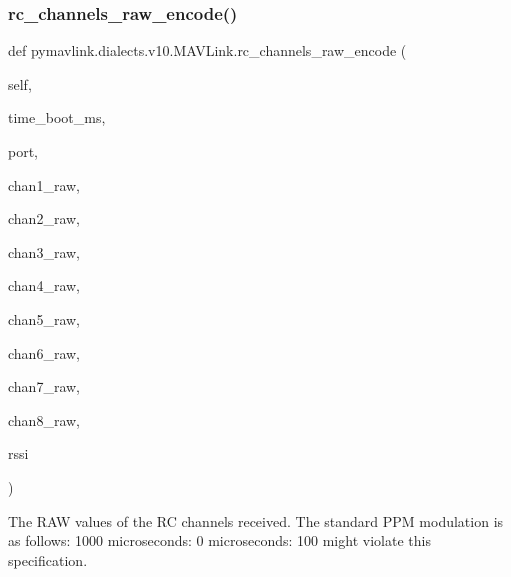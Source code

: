 \begin{DoxyVerb}
\begin{DoxyVerb}
\begin{DoxyVerb}
\begin{DoxyVerb}
\begin{DoxyVerb}
\subsubsection{\texorpdfstring{rc\+\_\+channels\+\_\+raw\+\_\+encode()}{rc\_channels\_raw\_encode()}}
{\footnotesize\ttfamily def pymavlink.\+dialects.\+v10.\+M\+A\+V\+Link.\+rc\+\_\+channels\+\_\+raw\+\_\+encode (\begin{DoxyParamCaption}\item[{}]{self,  }\item[{}]{time\+\_\+boot\+\_\+ms,  }\item[{}]{port,  }\item[{}]{chan1\+\_\+raw,  }\item[{}]{chan2\+\_\+raw,  }\item[{}]{chan3\+\_\+raw,  }\item[{}]{chan4\+\_\+raw,  }\item[{}]{chan5\+\_\+raw,  }\item[{}]{chan6\+\_\+raw,  }\item[{}]{chan7\+\_\+raw,  }\item[{}]{chan8\+\_\+raw,  }\item[{}]{rssi }\end{DoxyParamCaption})}

\begin{DoxyVerb}The RAW values of the RC channels received. The standard PPM
modulation is as follows: 1000 microseconds: 0%
microseconds: 100%
might violate this specification.


\end{DoxyVerb}
\end{DoxyVerb}
\end{DoxyVerb}
\end{DoxyVerb}
\end{DoxyVerb}
\end{DoxyVerb}
